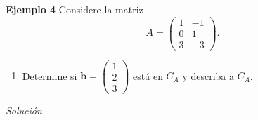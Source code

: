 \begin{frame}%
	
	
	\vspace{0mm}
	
	\begin{ej}{\textbf{Ejemplo  4}}
		Considere la matriz
		\[
		A = 
		\left( 
		\begin{array}{rr}	
		1 & -1  \\
		0 &  1 \\
		3 & -3
		\end{array} 
		\right).
		\]
		\begin{enumerate}
			\item[\labelname{$a$}] Determine si $\mathbf{b} = 
			\left( 
			\begin{array}{r}	
			1 \\
			2 \\
			3 
			\end{array} 
			\right)$ está en $C_A$ y describa a $C_A$.
		\end{enumerate}
	\end{ej}
	\textit{Solución.}
	
\end{frame}


